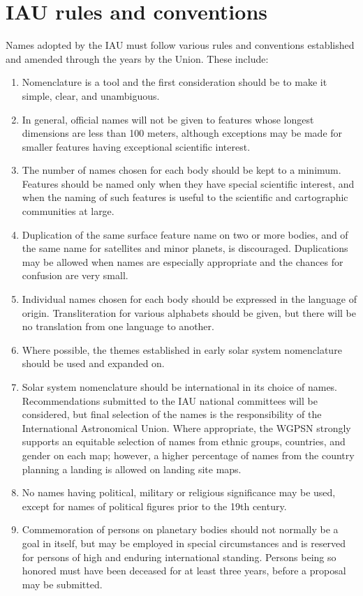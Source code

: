 \section{IAU rules and conventions}
\label{sec:Nomenclature:RulesAndConventions}
Names adopted by the IAU must follow various rules and conventions established and amended through the years by the Union. These include:
\begin{enumerate}
\item Nomenclature is a tool and the first consideration should be to make it simple, clear, and unambiguous.
\item In general, official names will not be given to features whose longest dimensions are less than 100 meters, although exceptions may be made for smaller features having exceptional scientific interest.
\item The number of names chosen for each body should be kept to a minimum. Features should be named only when they have special scientific interest, and when the naming of such features is useful to the scientific and cartographic communities at large.
\item Duplication of the same surface feature name on two or more bodies, and of the same name for satellites and minor planets, is discouraged. Duplications may be allowed when names are especially appropriate and the chances for confusion are very small.
\item Individual names chosen for each body should be expressed in the language of origin. Transliteration for various alphabets should be given, but there will be no translation from one language to another.
\item Where possible, the themes established in early solar system nomenclature should be used and expanded on.
\item Solar system nomenclature should be international in its choice of names. Recommendations submitted to the IAU national committees will be considered, but final selection of the names is the responsibility of the International Astronomical Union. Where appropriate, the WGPSN strongly supports an equitable selection of names from ethnic groups, countries, and gender on each map; however, a higher percentage of names from the country planning a landing is allowed on landing site maps.
\item No names having political, military or religious significance may be used, except for names of political figures prior to the 19th century.
\item Commemoration of persons on planetary bodies should not normally be a goal in itself, but may be employed in special circumstances and is reserved for persons of high and enduring international standing. Persons being so honored must have been deceased for at least three years, before a proposal may be submitted.

\end{enumerate}
